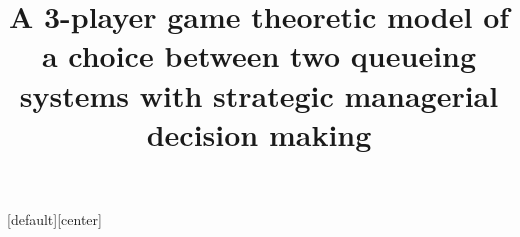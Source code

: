\documentclass{beamer}
\title{A 3-player game theoretic model of a choice between two queueing systems with strategic managerial decision making}
\author{}
\date{}
\begin{document}
    \titlepage
    [default][center]
    
    
    
    
    
    
    
\end{document}
